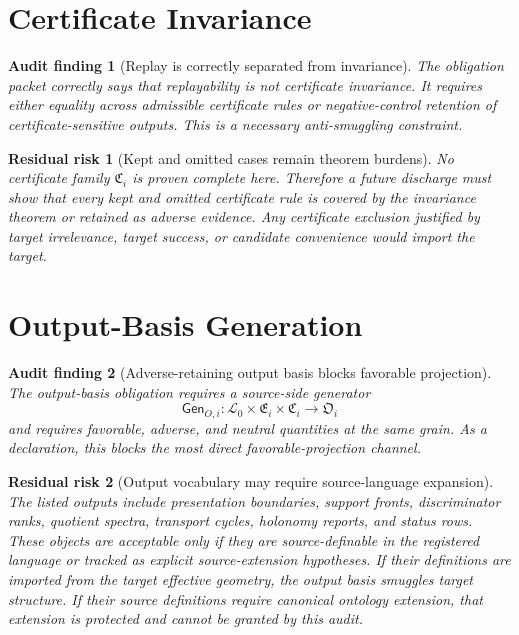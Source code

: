 \documentclass[11pt]{article}
\newcommand{\Lang}{\mathcal{L}_{0}}
\newcommand{\EnumFam}{\mathfrak{E}}
\newcommand{\CertFam}{\mathfrak{C}}
\newcommand{\OutFam}{\mathfrak{O}}
\newtheorem{auditfinding}{Audit finding}
\newtheorem{risk}{Residual risk}
\begin{document}
\section{Certificate Invariance}

\begin{auditfinding}[Replay is correctly separated from invariance]
The obligation packet correctly says that replayability is not certificate
invariance. It requires either equality across admissible certificate rules or
negative-control retention of certificate-sensitive outputs. This is a
necessary anti-smuggling constraint.
\end{auditfinding}

\begin{risk}[Kept and omitted cases remain theorem burdens]
No certificate family \(\CertFam_i\) is proven complete here. Therefore a
future discharge must show that every kept and omitted certificate rule is
covered by the invariance theorem or retained as adverse evidence. Any
certificate exclusion justified by target irrelevance, target success, or
candidate convenience would import the target.
\end{risk}

\section{Output-Basis Generation}

\begin{auditfinding}[Adverse-retaining output basis blocks favorable projection]
The output-basis obligation requires a source-side generator
\[
\mathsf{Gen}_{O,i}:\Lang\times \EnumFam_i\times\CertFam_i
\longrightarrow \OutFam_i
\]
and requires favorable, adverse, and neutral quantities at the same grain. As
a declaration, this blocks the most direct favorable-projection channel.
\end{auditfinding}

\begin{risk}[Output vocabulary may require source-language expansion]
The listed outputs include presentation boundaries, support fronts,
discriminator ranks, quotient spectra, transport cycles, holonomy reports, and
status rows. These objects are acceptable only if they are source-definable in
the registered language or tracked as explicit source-extension hypotheses. If
their definitions are imported from the target effective geometry, the output
basis smuggles target structure. If their source definitions require canonical
ontology extension, that extension is protected and cannot be granted by this
audit.
\end{risk}
\end{document}

